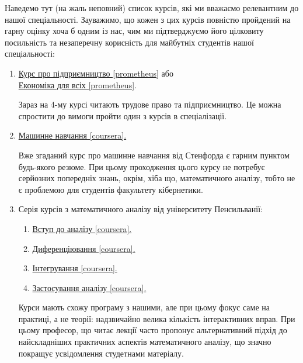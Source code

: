 \documentclass[14pt, a4paper]{extarticle}  %
\begin{document}
Наведемо тут (на жаль неповний) список курсів, які ми вважаємо релевантним до нашої спеціальності. Зауважимо, що кожен з цих курсів повністю пройдений на гарну оцінку хоча б одним із нас, чим ми підтверджуємо його цілковиту посильність та незаперечну корисність для майбутніх студентів нашої спеціальності:
\begin{enumerate}
    \item \href{https://prometheus.org.ua/entrepreneurship/}{Курс про підприємництво [prometheus]} або \\ \href{https://edx.prometheus.org.ua/courses/NaUKMA/103/2015_T1/about}{Економіка для всіх [prometheus]}.
    
    Зараз на 4-му курсі читають трудове право та підприємництво. Це можна спростити до вимоги пройти один з курсів в спеціалізації.
    
    \item \href{https://www.coursera.org/learn/machine-learning}{Машинне навчання [coursera].}
    
    Вже згаданий курс про машинне навчання від Стенфорда є гарним пунктом будь-якого резюме. При цьому проходження цього курсу не потребує серйозних попередніх знань, окрім, хіба що, математичного аналізу, тобто не є проблемою для студентів факультету кібернетики.
    
    \item Серія курсів з математичного аналізу від університету Пенсильванії:
	\begin{enumerate}
		\item \href{https://www.coursera.org/learn/single-variable-calculus/home/welcome}{Вступ до аналізу [coursera].}
		\item \href{https://www.coursera.org/learn/differentiation-calculus/home/welcome}{Диференціювання [coursera].}
		\item \href{https://www.coursera.org/learn/integration-calculus/home/welcome}{Інтегрування [coursera].}
		\item \href{https://www.coursera.org/learn/applications-calculus/home/welcome}{Застосування аналізу [coursera].}
	\end{enumerate}
    
    Курси мають схожу програму з нашими, але при цьому фокус саме на практиці, а не теорії: надзвичайно велика кількість інтерактивних вправ. При цьому професор, що читає лекції часто пропонує альтернативний підхід до найскладніших практичних аспектів математичного аналізу, що значно покращує усвідомлення студетнами матеріалу.


\end{enumerate}
\end{document}
